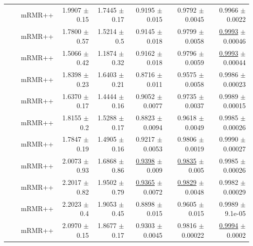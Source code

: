 \begin{longtable}{llp{}rrrrr}
 &  & mRMR++ & 1.9907 {\scriptsize $\pm$ 0.15} & 1.7445 {\scriptsize $\pm$ 0.17} & 0.9195 {\scriptsize $\pm$ 0.015} & 0.9792 {\scriptsize $\pm$ 0.0045} & 0.9966 {\scriptsize $\pm$ 0.0022} \\
 &  & mRMR++ & 1.7800 {\scriptsize $\pm$ 0.57} & 1.5214 {\scriptsize $\pm$ 0.5} & 0.9145 {\scriptsize $\pm$ 0.018} & 0.9799 {\scriptsize $\pm$ 0.0058} & \underline{0.9993} {\scriptsize $\pm$ 0.00046} \\
 &  & mRMR++ & 1.5066 {\scriptsize $\pm$ 0.42} & 1.1874 {\scriptsize $\pm$ 0.32} & 0.9162 {\scriptsize $\pm$ 0.018} & 0.9796 {\scriptsize $\pm$ 0.0059} & \underline{0.9993} {\scriptsize $\pm$ 0.00044} \\
 &  & mRMR++ & 1.8398 {\scriptsize $\pm$ 0.23} & 1.6403 {\scriptsize $\pm$ 0.21} & 0.8716 {\scriptsize $\pm$ 0.011} & 0.9575 {\scriptsize $\pm$ 0.0058} & 0.9986 {\scriptsize $\pm$ 0.00023} \\
 &  & mRMR++ & 1.6370 {\scriptsize $\pm$ 0.17} & 1.4444 {\scriptsize $\pm$ 0.16} & 0.9052 {\scriptsize $\pm$ 0.0077} & 0.9735 {\scriptsize $\pm$ 0.0037} & 0.9989 {\scriptsize $\pm$ 0.00015} \\
 &  & mRMR++ & 1.8155 {\scriptsize $\pm$ 0.2} & 1.5288 {\scriptsize $\pm$ 0.17} & 0.8823 {\scriptsize $\pm$ 0.0094} & 0.9618 {\scriptsize $\pm$ 0.0049} & 0.9985 {\scriptsize $\pm$ 0.00026} \\
 &  & mRMR++ & 1.7847 {\scriptsize $\pm$ 0.19} & 1.4905 {\scriptsize $\pm$ 0.16} & 0.9217 {\scriptsize $\pm$ 0.0053} & 0.9806 {\scriptsize $\pm$ 0.0019} & 0.9990 {\scriptsize $\pm$ 0.00027} \\
 &  & mRMR++ & 2.0073 {\scriptsize $\pm$ 0.93} & 1.6868 {\scriptsize $\pm$ 0.86} & \underline{0.9398} {\scriptsize $\pm$ 0.009} & \underline{0.9835} {\scriptsize $\pm$ 0.005} & 0.9985 {\scriptsize $\pm$ 0.00026} \\
 &  & mRMR++ & 2.2017 {\scriptsize $\pm$ 0.82} & 1.9502 {\scriptsize $\pm$ 0.79} & \underline{0.9365} {\scriptsize $\pm$ 0.0072} & \underline{0.9829} {\scriptsize $\pm$ 0.0048} & 0.9982 {\scriptsize $\pm$ 0.00029} \\
 &  & mRMR++ & 2.2023 {\scriptsize $\pm$ 0.4} & 1.9053 {\scriptsize $\pm$ 0.45} & 0.8898 {\scriptsize $\pm$ 0.015} & 0.9605 {\scriptsize $\pm$ 0.015} & 0.9989 {\scriptsize $\pm$ 9.1e-05} \\
 &  & mRMR++ & 2.0970 {\scriptsize $\pm$ 0.15} & 1.8677 {\scriptsize $\pm$ 0.17} & 0.9303 {\scriptsize $\pm$ 0.0045} & 0.9816 {\scriptsize $\pm$ 0.00022} & \underline{0.9994} {\scriptsize $\pm$ 0.0002} \\

\end{longtable}
